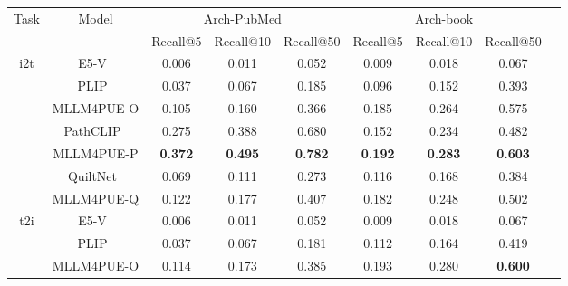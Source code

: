 \begin{table*}[h!]
\small
\centering
\begin{tabular}{ccccccccc}
\hline
\multirow{2}{*}{Task} & \multirow{2}{*}{Model} & \multicolumn{3}{c}{Arch-PubMed~\cite{gamper2021multiple}} & \multicolumn{3}{c}{Arch-book~\cite{gamper2021multiple}} \\ 
&& Recall@5 &Recall@10 & Recall@50 & Recall@5 & Recall@10 & Recall@50\\
\hline
\multirow{7}{*}{i2t} 
& E5-V~\cite{jiang2024e5} & 0.006 & 0.011 & 0.052 & 0.009 & 0.018 & 0.067\\ 
& \cellcolor{trainA} PLIP~\cite{huang2023visual} & \cellcolor{trainA} 0.037 & \cellcolor{trainA} 0.067 & \cellcolor{trainA} 0.185 & \cellcolor{trainA} 0.096 & \cellcolor{trainA} 0.152 & \cellcolor{trainA} 0.393\\ 
& \cellcolor{trainA} MLLM4PUE-O & \cellcolor{trainA} 0.105 & \cellcolor{trainA} 0.160 & \cellcolor{trainA} 0.366 & \cellcolor{trainA} 0.185 & \cellcolor{trainA} 0.264 & \cellcolor{trainA} 0.575\\ 
& \cellcolor{trainB} PathCLIP~\cite{ikezogwo2024quilt} & \cellcolor{trainB} 0.275 & \cellcolor{trainB} 0.388 & \cellcolor{trainB} 0.680 & \cellcolor{trainB} 0.152 & \cellcolor{trainB} 0.234 & \cellcolor{trainB} 0.482\\ 
& \cellcolor{trainB} MLLM4PUE-P & \cellcolor{trainB} \textbf{0.372} & \cellcolor{trainB} \textbf{0.495} & \cellcolor{trainB} \textbf{0.782} & \cellcolor{trainB} \textbf{0.192} & \cellcolor{trainB} \textbf{0.283} & \cellcolor{trainB} \textbf{0.603}\\ 
& \cellcolor{trainC} QuiltNet~\cite{ikezogwo2024quilt} & \cellcolor{trainC} 0.069 & \cellcolor{trainC} 0.111 & \cellcolor{trainC} 0.273 & \cellcolor{trainC} 0.116 & \cellcolor{trainC} 0.168 & \cellcolor{trainC} 0.384\\ 
& \cellcolor{trainC} MLLM4PUE-Q & \cellcolor{trainC} 0.122 & \cellcolor{trainC} 0.177 & \cellcolor{trainC} 0.407 & \cellcolor{trainC} 0.182 & \cellcolor{trainC} 0.248 & \cellcolor{trainC} 0.502\\ 
\hline
\multirow{7}{*}{t2i} 
& E5-V~\cite{jiang2024e5} & 0.006 & 0.011 & 0.052 & 0.009 & 0.018 & 0.067\\ 
& \cellcolor{trainA} PLIP~\cite{huang2023visual} & \cellcolor{trainA} 0.037 & \cellcolor{trainA} 0.067 & \cellcolor{trainA} 0.181 & \cellcolor{trainA} 0.112 & \cellcolor{trainA} 0.164 & \cellcolor{trainA} 0.419\\ 
& \cellcolor{trainA} MLLM4PUE-O & \cellcolor{trainA} 0.114 & \cellcolor{trainA} 0.173 & \cellcolor{trainA} 0.385 & \cellcolor{trainA} 0.193 & \cellcolor{trainA} 0.280 & \cellcolor{trainA} \textbf{0.600}\\ 

\end{tabular}
\end{table*}
